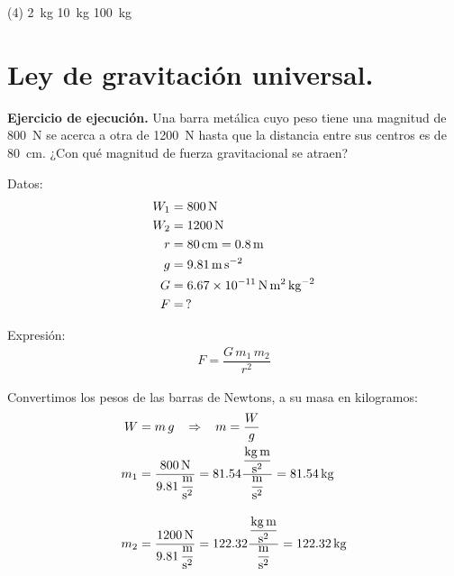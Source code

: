 \documentclass[12pt, letter]{exam}
\begin{document}
\begin{questions}
    \begin{tasks}(4)
        \task \SI{2}{\kilo\gram}
        \task \SI{10}{\kilo\gram}
        \task \SI{100}{\kilo\gram}
        \task {}
    \end{tasks}

    \section{Ley de gravitación universal.}

    \setcounter{question}{21} \question \label{Ejercicio_11} \textbf{Ejercicio de ejecución. } Una barra metálica cuyo peso tiene una magnitud de \SI{800}{\newton} se acerca a otra de \SI{1200}{\newton} hasta que la distancia entre sus centros es de \SI{80}{\centi\meter}. ¿Con qué magnitud de fuerza gravitacional se atraen?

    \begin{minipage}[t]{0.35\linewidth}
    Datos: 
    \begin{align*}
    W_{1} &= \SI{800}{\newton} \\
    W_{2} &= \SI{1200}{\newton} \\
    r &= \SI{80}{\centi\meter} = \SI{0.8}{\meter} \\
    g &= \SI{9.81}{\meter\per\square\second} \\
    G &= \SI{6.67d-11}{\newton\square\meter\per\square\kilo\gram} \\
    F &= \, ?
    \end{align*}
    \end{minipage}
    \hspace{1cm}
    \begin{minipage}[t]{0.4\linewidth}
    Expresión:
    \begin{align*}
    F = \dfrac{G \, m_{1} \, m_{2}}{r^{2}}
    \end{align*}
    \end{minipage}

    Convertimos los pesos de las barras de Newtons, a su masa en kilogramos:
    \begin{align*}
    W &= m \, g \hspace{0.3cm} \Rightarrow \hspace{0.3cm} m = \dfrac{W}{g} \\
    m_{1} &= \dfrac{\SI{800}{\newton}}{\displaystyle \SI[per-mode=fraction]{9.81}{\meter\per\square\second}} = \num{81.54} \dfrac{\displaystyle \unit[per-mode=fraction]{\kilo\gram\meter\per\square\second}}{\displaystyle \unit[per-mode=fraction]{\meter\per\square\second}} = \SI{81.54}{\kilo\gram} \\[1em]
    m_{2} &= \dfrac{\SI{1200}{\newton}}{\displaystyle \SI[per-mode=fraction]{9.81}{\meter\per\square\second}} = \num{122.32} \dfrac{\displaystyle \unit[per-mode=fraction]{\kilo\gram\meter\per\square\second}}{\displaystyle \unit[per-mode=fraction]{\meter\per\square\second}} = \SI{122.32}{\kilo\gram}
    \end{align*}


\end{questions}
\end{document}
